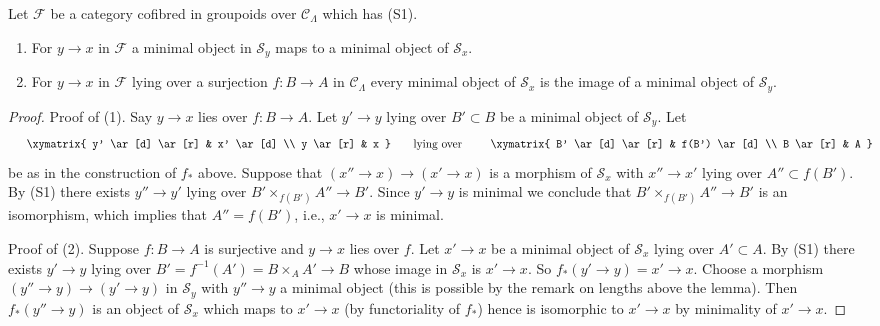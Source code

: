 \begin{lemma}
\label{lemma-smallest-where-descends}
Let $\mathcal{F}$ be a category cofibred in groupoids over
$\mathcal{C}_\Lambda$ which has (S1).
\begin{enumerate}
\item For $y \to x$ in $\mathcal{F}$ a minimal
object in $\mathcal{S}_y$ maps to a minimal object of $\mathcal{S}_x$.
\item For $y \to x$ in $\mathcal{F}$ lying over a surjection
$f : B \to A$ in $\mathcal{C}_\Lambda$ every minimal object
of $\mathcal{S}_x$ is the image of a minimal object of
$\mathcal{S}_y$.
\end{enumerate}
\end{lemma}

\begin{proof}
Proof of (1). Say $y \to x$ lies over $f : B \to A$. Let $y' \to y$
lying over $B' \subset B$ be a minimal object of $\mathcal{S}_y$. Let
$$
\vcenter{
\xymatrix{
y' \ar[d] \ar[r] & x' \ar[d] \\
y \ar[r] & x
}
}
\quad\text{lying over}\quad
\vcenter{
\xymatrix{
B' \ar[d] \ar[r] & f(B') \ar[d] \\
B \ar[r] & A
}
}
$$
be as in the construction of $f_*$ above. Suppose that
$(x'' \to x) \to (x' \to x)$ is a morphism of $\mathcal{S}_x$
with $x'' \to x'$ lying over $A'' \subset f(B')$. By (S1)
there exists $y'' \to y'$ lying over $B' \times_{f(B')} A'' \to B'$.
Since $y' \to y$ is minimal we conclude that
$B' \times_{f(B')} A'' \to B'$ is an isomorphism, which implies that
$A'' = f(B')$, i.e., $x' \to x$ is minimal.

\medskip\noindent
Proof of (2). Suppose $f : B \to A$ is surjective and $y \to x$ lies over $f$.
Let $x' \to x$ be a minimal object of $\mathcal{S}_x$ lying over $A' \subset A$.
By (S1) there exists $y' \to y$ lying over
$B' = f^{-1}(A') = B \times_A A' \to B$ whose image in $\mathcal{S}_x$ is
$x' \to x$. So $f_*(y' \to y) = x' \to x$.
Choose a morphism $(y'' \to y) \to (y' \to y)$ in
$\mathcal{S}_y$ with $y'' \to y$ a minimal object (this is possible by
the remark on lengths above the lemma). Then $f_*(y'' \to y)$ is an
object of $\mathcal{S}_x$ which maps to $x' \to x$ (by functoriality of
$f_*$) hence is isomorphic to $x' \to x$ by minimality of $x' \to x$.
\end{proof}

